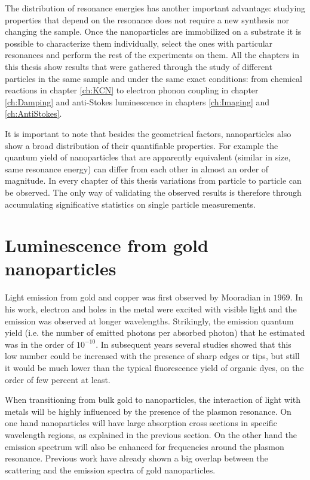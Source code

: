 The distribution of resonance energies has another important advantage: studying
properties that depend on the resonance does not require a new synthesis nor
changing the sample. Once the nanoparticles are immobilized on a substrate it is
possible to characterize them individually, select the ones with particular
resonances and perform the rest of the experiments on them. All the chapters in
this thesis show results that were gathered through the study of different
particles in the same sample and under the same exact conditions: from chemical
reactions in chapter \ref{ch:KCN} to electron phonon coupling in chapter
\ref{ch:Damping} and anti-Stokes luminescence in chapters \ref{ch:Imaging} and
\ref{ch:AntiStokes}.

It is important to note that besides the geometrical factors, nanoparticles also
show a broad distribution of their quantifiable properties. For example the
quantum yield of nanoparticles that are apparently equivalent (similar in size,
same resonance energy) can differ from each other in almost an order of
magnitude\cite{Yorulmaz2012}. In every chapter of this thesis variations from
particle to particle can be observed. The only way of validating the observed
results is therefore through accumulating significative statistics on single
particle measurements.

\section{Luminescence from gold nanoparticles}
\label{sec:luminescence}
Light emission from gold and copper was first observed by
Mooradian\cite{Mooradian1969} in $1969$. In his work, electron and holes in the
metal were excited with visible light and the emission was observed at longer
wavelengths. Strikingly, the emission quantum yield (i.e. the number of emitted
photons per absorbed photon) that he estimated was in the order of $10^{-10}$.
In subsequent years several studies showed that this low number could be
increased with the presence of sharp edges\cite{boyd1986photoinduced} or
tips\cite{Mohamed2000}, but still it would be much lower than the typical
fluorescence yield of organic dyes, on the order of few percent at least.

When transitioning from bulk gold to nanoparticles, the interaction of light
with metals will be highly influenced by the presence of the plasmon
resonance\cite{Dulkeith2004}. On one hand nanoparticles will have large
absorption cross sections in specific wavelength regions, as explained in the
previous section. On the other hand the emission spectrum will also be enhanced
for frequencies around the plasmon resonance. Previous work have already shown
a big overlap between the scattering and the emission spectra of gold
nanoparticles\cite{Yorulmaz2012}.

